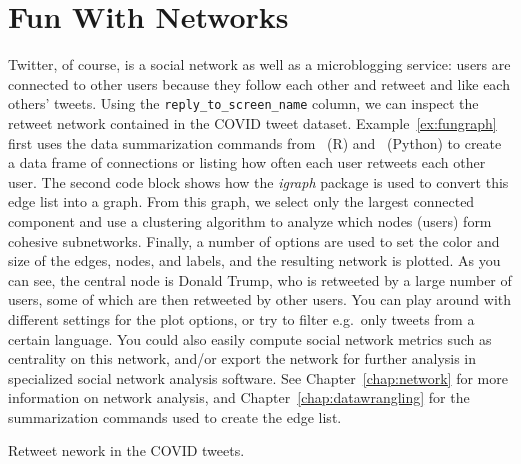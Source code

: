 

\section{Fun With Networks}

Twitter, of course, is a social network as well as a microblogging service:
users are connected to other users because they follow each other and retweet and like each others' tweets.
Using the \verb+reply_to_screen_name+ column, we can inspect the retweet network contained in the COVID tweet dataset.
Example~\ref{ex:fungraph} first uses the data summarization commands from \tidyverse\ (R) and \pandas\ (Python) to
create a data frame of connections or  listing how often each user retweets each other user.
The second code block shows how the \emph{igraph} package is used to convert this edge list into a graph.
From this graph, we select only the largest connected component and use a clustering algorithm to analyze which
nodes (users) form cohesive subnetworks.
Finally, a number of options are used to set the color and size of the edges, nodes, and labels,
and the resulting network is plotted.
As you can see, the central node is Donald Trump, who is retweeted by a large number of users,
some of which are then retweeted by other users.
You can play around with different settings for the plot options,
or try to filter e.g.\ only tweets from a certain language. 
You could also easily compute social network metrics such as centrality on this network,
and/or export the network for further analysis in specialized social network analysis software.
See Chapter~\ref{chap:network} for more information on network analysis,
and Chapter~\ref{chap:datawrangling} for the summarization commands used to create the edge list.

\begin{ccsexample}
\caption{Retweet nework in the COVID tweets.}\label{ex:fungraph}
\end{ccsexample}

